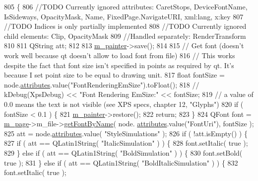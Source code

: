 \begin{DoxyCode}
805 \{
806     \textcolor{comment}{//TODO Currently ignored attributes: CaretStops, DeviceFontName, IsSideways, OpacityMask, Name,
       FixedPage.NavigateURI, xml:lang, x:key}
807     \textcolor{comment}{//TODO Indices is only partially implemented}
808     \textcolor{comment}{//TODO Currently ignored child elements: Clip, OpacityMask}
809     \textcolor{comment}{//Handled separately: RenderTransform}
810 
811     QString att;
812 
813     \hyperlink{classXpsHandler_a2db77df5312274e6f1d7e274b45c9d21}{m\_painter}->save();
814 
815     \textcolor{comment}{// Get font (doesn't work well because qt doesn't allow to load font from file)}
816     \textcolor{comment}{// This works despite the fact that font size isn't specified in points as required by qt. It's because
       I set point size to be equal to drawing unit.}
817     \textcolor{keywordtype}{float} fontSize = node.\hyperlink{classXpsRenderNode_a7f6fca2e06dd119e7eb20139af6c8477}{attributes}.value(\textcolor{stringliteral}{"FontRenderingEmSize"}).toFloat();
818     \textcolor{comment}{// kDebug(XpsDebug) << "Font Rendering EmSize:" << fontSize;}
819     \textcolor{comment}{// a value of 0.0 means the text is not visible (see XPS specs, chapter 12, "Glyphs")}
820     \textcolor{keywordflow}{if} ( fontSize < 0.1 ) \{
821         \hyperlink{classXpsHandler_a2db77df5312274e6f1d7e274b45c9d21}{m\_painter}->restore();
822         \textcolor{keywordflow}{return};
823     \}
824     QFont font = \hyperlink{classXpsHandler_a57252ea44adece639b38d84237222d7f}{m\_page}->m\_file->\hyperlink{classXpsFile_a3eaa64c752c7aa845409abb440e9eda0}{getFontByName}( node.
      \hyperlink{classXpsRenderNode_a7f6fca2e06dd119e7eb20139af6c8477}{attributes}.value(\textcolor{stringliteral}{"FontUri"}), fontSize );
825     att = node.\hyperlink{classXpsRenderNode_a7f6fca2e06dd119e7eb20139af6c8477}{attributes}.value( \textcolor{stringliteral}{"StyleSimulations"} );
826     \textcolor{keywordflow}{if}  ( !att.isEmpty() ) \{
827         \textcolor{keywordflow}{if} ( att == QLatin1String( \textcolor{stringliteral}{"ItalicSimulation"} ) ) \{
828             font.setItalic( \textcolor{keyword}{true} );
829         \} \textcolor{keywordflow}{else} \textcolor{keywordflow}{if} ( att == QLatin1String( \textcolor{stringliteral}{"BoldSimulation"} ) ) \{
830             font.setBold( \textcolor{keyword}{true} );
831         \} \textcolor{keywordflow}{else} \textcolor{keywordflow}{if} ( att == QLatin1String( \textcolor{stringliteral}{"BoldItalicSimulation"} ) ) \{
832             font.setItalic( \textcolor{keyword}{true} );

\end{DoxyCode}
